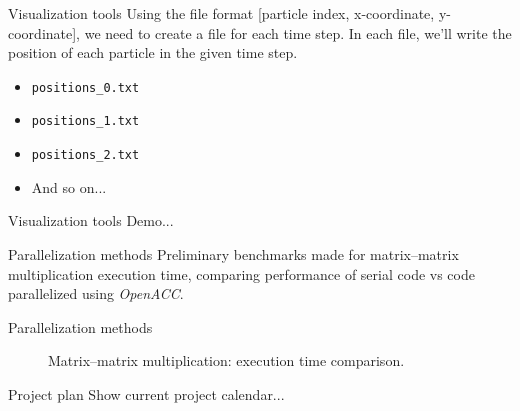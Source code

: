 \documentclass[aspectratio=169]{beamer}
\begin{document}
\begin{frame}[fragile]{Visualization tools}
	Using the file format [particle index, x-coordinate, y-coordinate], we need to create a file for each time step. In each file, we'll write the position of each particle in the given time step.
	\begin{itemize}
		\item \texttt{positions\_0.txt}
		\item \texttt{positions\_1.txt}
		\item \texttt{positions\_2.txt}
		\item And so on...
	\end{itemize}
\end{frame}

\begin{frame}[fragile]{Visualization tools}
	Demo...
\end{frame}

\begin{frame}[fragile]{Parallelization methods}
	Preliminary benchmarks made for matrix--matrix multiplication execution time, comparing performance of serial code vs code parallelized using \emph{OpenACC}.
\end{frame}

\begin{frame}[fragile]{Parallelization methods}
	\begin{figure}[H]
		\centering
		
		\caption{Matrix--matrix multiplication: execution time comparison.}
	\end{figure}
\end{frame}

\begin{frame}[fragile]{Project plan}
	Show current project calendar...
\end{frame}
\end{document}

